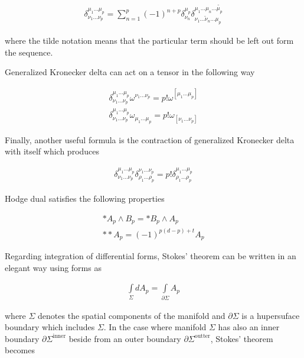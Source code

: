 \documentclass[a4paper,notitlepage]{report}
\begin{document}
\begin{align}
\delta^{\mu_{1} \ldots \mu_{p}}_{\nu_{1} \ldots \nu_{p}} = \sum_{n=1}^{p} (-1)^{n+p} \delta^{\mu_{p}}_{\nu_{n}} \delta^{\mu_{1} \ldots \mu_{n} \ldots \tilde{\mu_{p}}}_{\nu_{1} \ldots {\tilde{\nu}}_{n} \ldots \mu_{p}} 
\end{align}

\vspace{0.5em}
where the tilde notation means that the particular term should be left out form the sequence.

Generalized Kronecker delta can act on a tensor in the following way

\begin{align}
\delta^{\mu_{1} \ldots \mu_{p}}_{\nu_{1} \ldots \nu_{p}} \omega^{\nu_{1} \ldots \nu_{p}}  = p! \omega^{[\mu_{1} \ldots \mu_{p}]}  \\
\delta^{\mu_{1} \ldots \mu_{p}}_{\nu_{1} \ldots \nu_{p}} \omega_{\mu_{1} \ldots \mu_{p}}  = p! \omega_{[\nu_{1} \ldots \nu_{p}]} 
\end{align}

\vspace{0.5em}
Finally, another useful formula is the contraction of generalized Kronecker delta with itself which produces

\begin{align}
\delta^{\mu_{1} \ldots \mu_{p}}_{\nu_{1} \ldots \nu_{p}} \delta_{\rho_{1} \ldots \rho_{p}}^{\nu_{1} \ldots \nu_{p}}  = p! \delta^{\mu_{1} \ldots \mu_{p}}_{\rho_{1} \ldots \rho_{p}}
\end{align}

\vspace{0.5em}
Hodge dual satisfies the following properties

\begin{align}
*A_p \wedge B_p = *B_p \wedge A_p \\
**A_p = (-1)^{p(d-p) + t} A_p
\end{align}

\vspace{0.5em}
Regarding integration of differential forms, Stokes' theorem can be written in an elegant way using forms as

\begin{align}
\int\limits_{\Sigma} dA_p =  \int\limits_{\partial \Sigma} A_p
\end{align}

\vspace{0.5em}
where $\Sigma$ denotes the spatial components of the manifold and $\partial \Sigma$ is a hupersuface boundary which includes $\Sigma$. In the case where manifold $\Sigma$ has also an inner boundary $\partial \Sigma^{\text{inner}}$ beside from an outer boundary $\partial \Sigma^{\text{outter}}$, Stokes' theorem becomes
\end{document}
